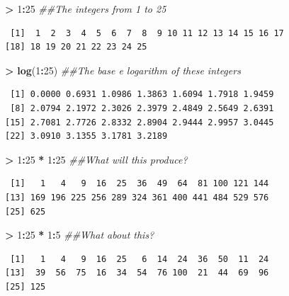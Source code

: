 \documentclass[]{krantz}
\makeatletter
\newenvironment{Shaded}{\begin{snugshade}}{\end{snugshade}}
\newcommand{\CommentTok}[1]{\textcolor[rgb]{0.37,0.37,0.37}{\textit{#1}}}
\newcommand{\DecValTok}[1]{\textcolor[rgb]{0.06,0.06,0.06}{#1}}
\newcommand{\KeywordTok}[1]{\textcolor[rgb]{0.27,0.27,0.27}{\textbf{#1}}}
\newcommand{\NormalTok}[1]{#1}
\newcommand{\OperatorTok}[1]{\textcolor[rgb]{0.43,0.43,0.43}{\textbf{#1}}}
\newcommand{\StringTok}[1]{\textcolor[rgb]{0.5,0.5,0.5}{#1}}
\newenvironment{kframe}{%
\medskip{}
\setlength{\fboxsep}{.8em}
 \def\at@end@of@kframe{}%
 \ifinner\ifhmode%
  \def\at@end@of@kframe{\end{minipage}}%
  \begin{minipage}{\columnwidth}%
 \fi\fi%
 \def\FrameCommand##1{\hskip\@totalleftmargin \hskip-\fboxsep
 \colorbox{shadecolor}{##1}\hskip-\fboxsep
     \hskip-\linewidth \hskip-\@totalleftmargin \hskip\columnwidth}%
 \MakeFramed {\advance\hsize-\width
   \@totalleftmargin\z@ \linewidth\hsize
   \@setminipage}}%
 {\par\unskip\endMakeFramed%
 \at@end@of@kframe}
\renewenvironment{Shaded}{\begin{kframe}}{\end{kframe}}
\makeatother
\begin{document}
\begin{Shaded}
\begin{Highlighting}[]
\OperatorTok{>}\StringTok{ }\DecValTok{1}\OperatorTok{:}\DecValTok{25}  \CommentTok{##The integers from 1 to 25}
\end{Highlighting}
\end{Shaded}

\begin{verbatim}
 [1]  1  2  3  4  5  6  7  8  9 10 11 12 13 14 15 16 17
[18] 18 19 20 21 22 23 24 25
\end{verbatim}

\begin{Shaded}
\begin{Highlighting}[]
\OperatorTok{>}\StringTok{ }\KeywordTok{log}\NormalTok{(}\DecValTok{1}\OperatorTok{:}\DecValTok{25}\NormalTok{)  }\CommentTok{##The base e logarithm of these integers}
\end{Highlighting}
\end{Shaded}

\begin{verbatim}
 [1] 0.0000 0.6931 1.0986 1.3863 1.6094 1.7918 1.9459
 [8] 2.0794 2.1972 2.3026 2.3979 2.4849 2.5649 2.6391
[15] 2.7081 2.7726 2.8332 2.8904 2.9444 2.9957 3.0445
[22] 3.0910 3.1355 3.1781 3.2189
\end{verbatim}

\begin{Shaded}
\begin{Highlighting}[]
\OperatorTok{>}\StringTok{ }\DecValTok{1}\OperatorTok{:}\DecValTok{25} \OperatorTok{*}\StringTok{ }\DecValTok{1}\OperatorTok{:}\DecValTok{25}  \CommentTok{##What will this produce?}
\end{Highlighting}
\end{Shaded}

\begin{verbatim}
 [1]   1   4   9  16  25  36  49  64  81 100 121 144
[13] 169 196 225 256 289 324 361 400 441 484 529 576
[25] 625
\end{verbatim}

\begin{Shaded}
\begin{Highlighting}[]
\OperatorTok{>}\StringTok{ }\DecValTok{1}\OperatorTok{:}\DecValTok{25} \OperatorTok{*}\StringTok{ }\DecValTok{1}\OperatorTok{:}\DecValTok{5}  \CommentTok{##What about this?}
\end{Highlighting}
\end{Shaded}

\begin{verbatim}
 [1]   1   4   9  16  25   6  14  24  36  50  11  24
[13]  39  56  75  16  34  54  76 100  21  44  69  96
[25] 125
\end{verbatim}
\end{document}
